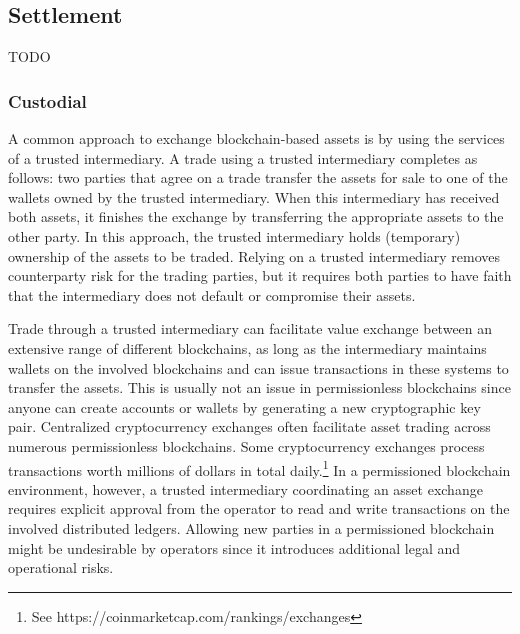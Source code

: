 \subsection{Settlement}
TODO

\subsubsection{Custodial}
A common approach to exchange blockchain-based assets is by using the services of a trusted intermediary.
A trade using a trusted intermediary completes as follows: two parties that agree on a trade transfer the assets for sale to one of the wallets owned by the trusted intermediary.
When this intermediary has received both assets, it finishes the exchange by transferring the appropriate assets to the other party.
In this approach, the trusted intermediary holds (temporary) ownership of the assets to be traded.
Relying on a trusted intermediary removes counterparty risk for the trading parties, but it requires both parties to have faith that the intermediary does not default or compromise their assets.

Trade through a trusted intermediary can facilitate value exchange between an extensive range of different blockchains, as long as the intermediary maintains wallets on the involved blockchains and can issue transactions in these systems to transfer the assets.
This is usually not an issue in permissionless blockchains since anyone can create accounts or wallets by generating a new cryptographic key pair.
Centralized cryptocurrency exchanges often facilitate asset trading across numerous permissionless blockchains.
Some cryptocurrency exchanges process transactions worth millions of dollars in total daily.\footnote{See https://coinmarketcap.com/rankings/exchanges}
In a permissioned blockchain environment, however, a trusted intermediary coordinating an asset exchange requires explicit approval from the operator to read and write transactions on the involved distributed ledgers.
Allowing new parties in a permissioned blockchain might be undesirable by operators since it introduces additional legal and operational risks.

